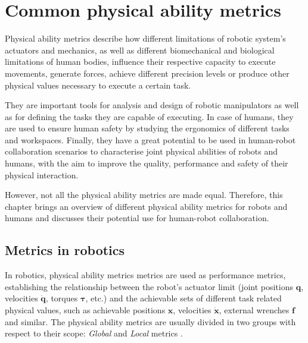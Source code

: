 \section{Common physical ability metrics}

Physical ability metrics describe how different limitations of robotic system's actuators and mechanics, as well as different biomechanical and biological limitations of human bodies, influence their respective capacity to execute movements, generate forces, achieve different precision levels or produce other physical values necessary to execute a certain task.

They are important tools for analysis and design of robotic manipulators as well as for defining the tasks they are capable of executing. In case of humans, they are used to ensure human safety by studying the ergonomics of different tasks and workspaces. Finally, they have a great potential to be used in human-robot collaboration scenarios to characterise joint physical abilities of robots and humans, with the aim to improve the quality, performance and safety of their physical interaction.

However, not all the physical ability metrics are made equal. Therefore, this chapter brings an overview of different physical ability metrics for robots and humans and discusses their potential use for human-robot collaboration.

\subsection{Metrics in robotics}
In robotics, physical ability metrics metrics are used as performance metrics, establishing the relationship between the robot's actuator limit (joint positions $\bm{q}$, velocities $\dot{\bm{q}}$, torques $\bm{\tau}$, etc.) and the achievable sets of different task related physical values, such as achievable positions $\bm{x}$, velocities $\dot{\bm{x}}$, external wrenches $\bm{f}$ and similar. The physical ability metrics are usually divided in two groups with respect to their scope: \textit{Global} and \textit{Local} metrics  \cite{russo2022measuring}. 

